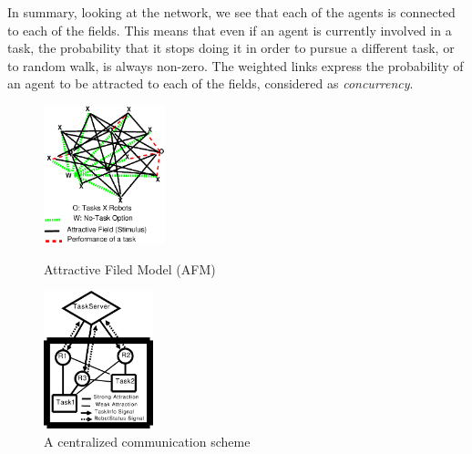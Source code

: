 \documentclass{llncs}
\begin{document}
In summary, looking at the network, we see that each of the agents is connected to each of the fields. This means that even if an agent is currently involved in a task, the probability that it stops doing it in order to pursue a different task, or to random walk, is always non-zero. The weighted links express the probability of an agent to be attracted to each of the fields, considered as {\em concurrency}.
\begin{figure}
\begin{minipage}[t]{0.48\linewidth}
\centering
\includegraphics[height=4cm, angle=0]{./images/AFM-Diag2.eps}
\caption{\small Attractive Filed Model (AFM)}
\label{fig:afm} %
\end{minipage}
\hspace{0.5cm}
\begin{minipage}[t]{0.48\linewidth}
\centering
\includegraphics[height=4cm, angle=0]{./images/CentralizedComm.eps}
\caption{\small A centralized communication scheme} %
\label{fig:ccm} %
\end{minipage}
\end{figure}
\end{document}
